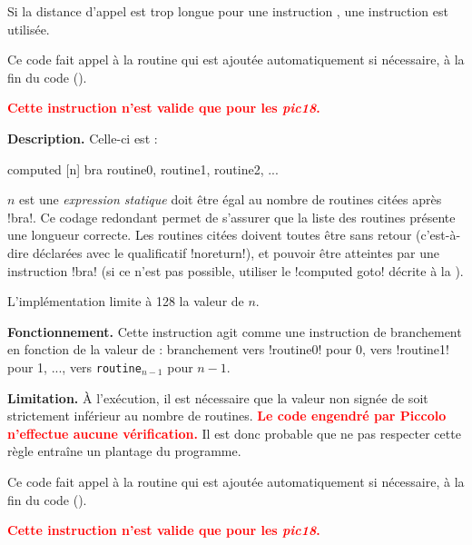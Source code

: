 Si la distance d'appel est trop longue pour une instruction , une instruction  est utilisée.

Ce code fait appel à la routine  qui est ajoutée automatiquement si nécessaire, à la fin du code (). 


\textcolor{red}{\bf Cette instruction n'est valide que pour les \emph{pic18}.}

\textbf{Description.} Celle-ci est :
\begin{piccolo}
computed [n] bra routine0, routine1, routine2, ...
\end{piccolo}

$n$ est une \emph{expression statique} doit être égal au nombre de routines citées après \pic!bra!. Ce codage redondant permet de s'assurer que la liste des routines présente une longueur correcte. Les routines citées doivent toutes être sans retour (c'est-à-dire déclarées avec le qualificatif \pic!noreturn!), et pouvoir être atteintes par une instruction \pic!bra! (si ce n'est pas possible, utiliser le \pic!computed goto! décrite à la ).

L'implémentation limite à 128 la valeur de $n$.

\textbf{Fonctionnement.} Cette instruction agit comme une instruction de branchement en fonction de la valeur de  : branchement vers \pic!routine0! pour 0, vers \pic!routine1! pour 1, ..., vers \texttt{routine}$_{n-1}$ pour $n-1$. 

\textbf{Limitation.} À l'exécution, il est nécessaire que la valeur non signée de  soit strictement inférieur au nombre de routines. \textcolor{red}{\bf Le code engendré par Piccolo n'effectue aucune vérification.} Il est donc probable que ne pas respecter cette règle entraîne un plantage du programme.

Ce code fait appel à la routine  qui est ajoutée automatiquement si nécessaire, à la fin du code (). 




\textcolor{red}{\bf Cette instruction n'est valide que pour les \emph{pic18}.}

